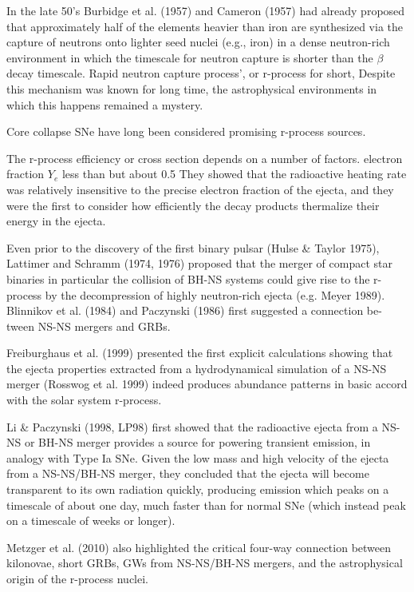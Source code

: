 In the late 50's Burbidge et al. (1957) and Cameron (1957) had already proposed that approximately half of the elements heavier than iron are synthesized via the capture of neutrons onto lighter seed nuclei (e.g., iron) in a dense neutron-rich environment in which the timescale for neutron capture is shorter than the $\beta$ decay timescale.
Rapid neutron capture process', or r-process for short, 
Despite this mechanism was known for long time, the astrophysical environments in which this happens remained a mystery.

Core collapse SNe have long been considered promising r-process sources.

The r-process efficiency or cross section depends on a number of factors.
electron fraction $Y_{e}$ less than but about 0.5
They showed that the radioactive heating rate was relatively insensitive to the precise electron fraction of the ejecta, and they were the first to consider how efficiently the decay products thermalize their energy in the ejecta.

Even prior to the discovery of the first binary pulsar (Hulse \& Taylor 1975), Lattimer and Schramm (1974, 1976) proposed that the merger of compact star binaries in particular the collision of BH-NS systems could give rise to the r-process by the decompression of highly neutron-rich ejecta (e.g. Meyer 1989). Blinnikov et al. (1984) and Paczynski (1986) first suggested a connection be- tween NS-NS mergers and GRBs.

Freiburghaus et al. (1999) presented the first explicit calculations showing that the ejecta properties extracted from a hydrodynamical simulation of a NS-NS merger (Rosswog et al. 1999) indeed produces abundance patterns in basic accord with the solar system r-process.

Li \& Paczynski (1998, LP98) first showed that the radioactive ejecta from a NS-NS or BH-NS merger provides a source for powering transient emission, in analogy with Type Ia SNe. Given the low mass and high velocity of the ejecta from a NS-NS/BH-NS merger, they concluded that the ejecta will become transparent to its own radiation quickly, producing emission which peaks on a timescale of about one day, much faster than for normal SNe (which instead peak on a timescale of weeks or longer).

Metzger et al. (2010) also highlighted the critical four-way connection between kilonovae, short GRBs, GWs from NS-NS/BH-NS mergers, and the astrophysical origin of the r-process nuclei.

